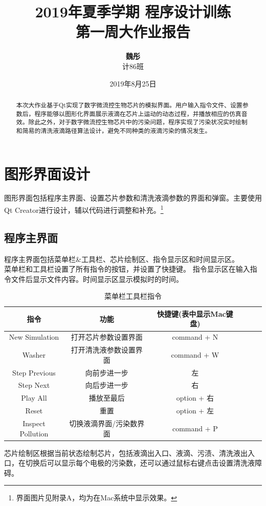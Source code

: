 \documentclass[12pt, a4paper]{article}
\title{\textbf{\LARGE 2019年夏季学期 \quad 程序设计训练 \\ 第一周大作业报告}}
\author{\textbf{魏彤} \\ 计86班 \quad 2018011417}
\date{2019年8月25日}
\begin{document}
	
	\maketitle
	
	\begin{abstract}
		本次大作业基于Qt实现了数字微流控生物芯片的模拟界面。用户输入指令文件、设置参数后，程序能够以图形化界面展示液滴在芯片上运动的动态过程，并播放相应的仿真音效。除此之外，对于数字微流控生物芯片中的污染问题，程序实现了污染状况实时绘制和简易的清洗液滴路径算法设计，避免不同种类的液滴污染的情况发生。
	\end{abstract}
	
	\section{图形界面设计}
		图形界面包括程序主界面、设置芯片参数和清洗液滴参数的界面和弹窗。主要使用Qt Creator进行设计，辅以代码进行调整和补充。\footnote{界面图片见附录A，均为在Mac系统中显示效果。}
		\subsection{程序主界面}
		程序主界面包括菜单栏\&工具栏、芯片绘制区、指令显示区和时间显示区。 \\ \hspace*{0.8cm}
		菜单栏和工具栏设置了所有指令的按钮，并设置了快捷键。
		指令显示区在输入指令文件后显示文件内容。时间显示区显示模拟时的时间。
		\begin{table}  
			\centering  
			\caption{菜单栏工具栏指令}  
			\begin{tabular}  
				{cccccc}  
				\toprule[1pt]  
				指令 & 功能 & 快捷键(表中显示Mac键盘)  \\  
				\midrule  
				New Simulation    & 打开芯片参数设置界面      & command + N \\  
				Washer   	      & 打开清洗液参数设置界面    & command + W \\
				Step Previous     & 向前步进一步   	       & 左 \\
				Step Next	      & 向后步进一步			   & 右 \\
				Play All          & 播放至最后				& option + 右 \\
				Reset             & 重置				     & option + 左  \\
				Inspect Pollution & 切换液滴界面/污染数界面   & command + P \\
				\bottomrule[1pt]  
			\end{tabular}  
		\end{table}
		芯片绘制区根据当前状态绘制芯片，包括液滴出入口、液滴、污渍、清洗液出入口，在切换后可以显示每个电极的污染数，还可以通过鼠标右键点击设置清洗液障碍。
		
\end{document}
